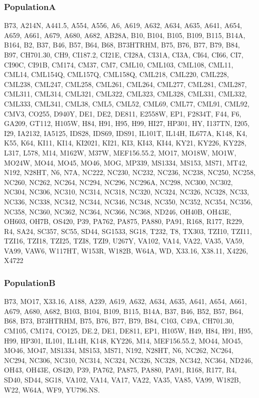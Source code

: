 \documentclass[12pt]{article}
\begin{document}
\subsubsection*{ PopulationA}
B73, A214N, A441.5, A554, A556, A6, A619, A632, A634, A635, A641, A654, A659, A661, A679, A680, A682, AB28A, B10, B104, B105, B109, B115, B14A, B164, B2, B37, B46, B57, B64, B68, B73HTRHM, B75, B76, B77, B79, B84, B97, CH701.30, CH9, CI187.2, CI21E, CI28A, CI31A, CI3A, CI64, CI66, CI7, CI90C, CI91B, CM174, CM37, CM7, CML10, CML103, CML108, CML11, CML14, CML154Q, CML157Q, CML158Q, CML218, CML220, CML228, CML238, CML247, CML258, CML261, CML264, CML277, CML281, CML287, CML311, CML314, CML321, CML322, CML323, CML328, CML331, CML332, CML333, CML341, CML38, CML5, CML52, CML69, CML77, CML91, CML92, CMV3, CO255, D940Y, DE1, DE2, DE811, E2558W, EP1, F2834T, F44, F6, GA209, GT112, H105W, H84, H91, H95, H99, HI27, HP301, HY, I137TN, I205, I29, IA2132, IA5125, IDS28, IDS69, IDS91, IL101T, IL14H, IL677A, K148, K4, K55, K64, KI11, KI14, KI2021, KI21, KI3, KI43, KI44, KY21, KY226, KY228, L317, L578, M14, M162W, M37W, MEF156.55.2, MO17, MO18W, MO1W, MO24W, MO44, MO45, MO46, MOG, MP339, MS1334, MS153, MS71, MT42, N192, N28HT, N6, N7A, NC222, NC230, NC232, NC236, NC238, NC250, NC258, NC260, NC262, NC264, NC294, NC296, NC296A, NC298, NC300, NC302, NC304, NC306, NC310, NC314, NC318, NC320, NC324, NC326, NC328, NC33, NC336, NC338, NC342, NC344, NC346, NC348, NC350, NC352, NC354, NC356, NC358, NC360, NC362, NC364, NC366, NC368, ND246, OH40B, OH43E, OH603, OH7B, OS420, P39, PA762, PA875, PA880, PA91, R168, R177, R229, R4, SA24, SC357, SC55, SD44, SG1533, SG18, T232, T8, TX303, TZI10, TZI11, TZI16, TZI18, TZI25, TZI8, TZI9, U267Y, VA102, VA14, VA22, VA35, VA59, VA99, VAW6, W117HT, W153R, W182B, W64A, WD, X33.16, X38.11, X4226, X4722

\subsubsection*{ PopulationB}
B73, MO17, X33.16, A188, A239, A619, A632, A634, A635, A641, A654, A661, A679, A680, A682, B103, B104, B109, B115, B14A, B37, B46, B52, B57, B64, B68, B73, B73HTRHM, B75, B76, B77, B79, B84, C103, C49A, CH701.30, CM105, CM174, CO125, DE.2, DE1, DE811, EP1, H105W, H49, H84, H91, H95, H99, HP301, IL101, IL14H, K148, KY226, M14, MEF156.55.2, MO44, MO45, MO46, MO47, MS1334, MS153, MS71, N192, N28HT, N6, NC262, NC264, NC294, NC306, NC310, NC314, NC324, NC326, NC328, NC342, NC364, ND246, OH43, OH43E, OS420, P39, PA762, PA875, PA880, PA91, R168, R177, R4, SD40, SD44, SG18, VA102, VA14, VA17, VA22, VA35, VA85, VA99, W182B, W22, W64A, WF9, YU796.NS.
\end{document}
